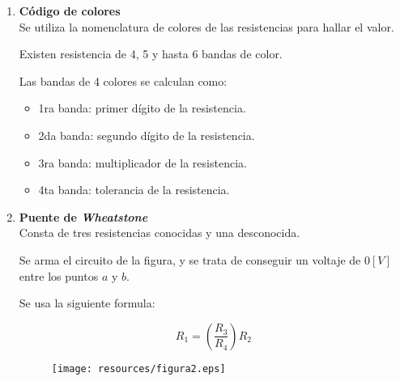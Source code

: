 \documentclass[letter,11pt]{article}
\begin{document}
\begin{enumerate}
\begin{enumerate}
        \item \textbf{Código de colores} \\
        Se utiliza la nomenclatura de colores de las resistencias para hallar el
        valor.

        Existen resistencia de 4, 5 y hasta 6 bandas de color.

        Las bandas de 4 colores se calculan como:

        \begin{itemize}
            \item 1ra banda: primer dígito de la resistencia.
            \item 2da banda: segundo dígito de la resistencia.
            \item 3ra banda: multiplicador de la resistencia.
            \item 4ta banda: tolerancia de la resistencia.
        \end{itemize}

        \item \textbf{Puente de \emph{Wheatstone}} \\
        Consta de tres resistencias conocidas y una desconocida.

        Se arma el circuito de la figura, y se trata de conseguir un voltaje de
        $0 [V]$ entre los puntos $a$ y $b$.

        Se usa la siguiente formula:

        \begin{equation*}
            R_1 = \left(\frac{R_3}{R_4}\right) R_2
        \end{equation*}

        \begin{figure}[!h]
        \centering
        \texttt{[image: resources/figura2.eps]}
        \end{figure}

    \end{enumerate}

\end{enumerate}
\end{document}

